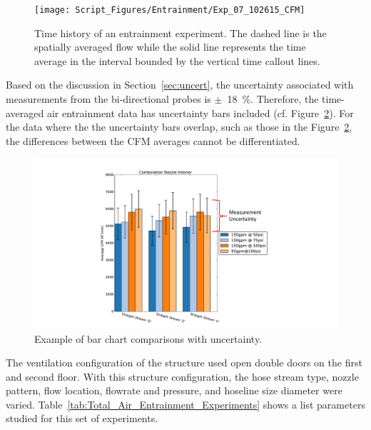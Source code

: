 \documentclass[12pt,oneside]{book}
\begin{document}
\begin{figure}[!ht]
\centering
\texttt{[image: Script\_Figures/Entrainment/Exp\_07\_102615\_CFM]} 
\caption[Time History of Entrainment Experiment]{Time history of an entrainment experiment. The dashed line is the spatially averaged flow while the solid line represents the time average in the interval bounded by the vertical time callout lines.}
\label{fig:cfmplotexplainer}
\end{figure}

Based on the discussion in Section~\ref{sec:uncert}, the uncertainty associated with measurements from the bi-directional probes is $\pm$~18~\%. Therefore, the time-averaged air entrainment data has uncertainty bars included (cf. Figure~\ref{fig:cfmbarexplainer}). For the data where the the uncertainty bars overlap, such as those in the Figure~\ref{fig:cfmbarexplainer}, the differences between the CFM averages cannot be differentiated. 

\begin{figure}[!ht]
\centering
\includegraphics[width=.8\columnwidth]{Figures/Air_Entrainment/Total_Entrainment_Example} 
\caption[Average Flow Rate Comparison]{Example of bar chart comparisons with uncertainty.}
\label{fig:cfmbarexplainer}
\end{figure}

The  ventilation configuration of the structure used open double doors on the first and second floor. With this structure configuration, the hose stream type, nozzle pattern, flow location, flowrate and pressure, and hoseline size diameter were varied. Table~\ref{tab:Total_Air_Entrainment_Experiments} shows a list parameters studied for this set of experiments.
\end{document}
